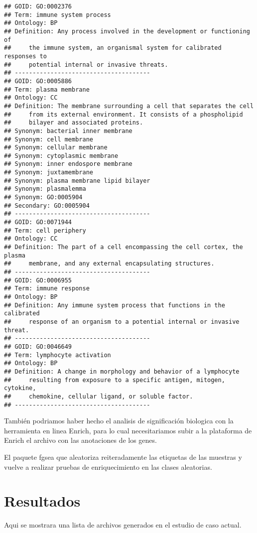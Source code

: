 \documentclass[
]{article}
\begin{document}
\begin{verbatim}
## GOID: GO:0002376
## Term: immune system process
## Ontology: BP
## Definition: Any process involved in the development or functioning of
##     the immune system, an organismal system for calibrated responses to
##     potential internal or invasive threats.
## --------------------------------------
## GOID: GO:0005886
## Term: plasma membrane
## Ontology: CC
## Definition: The membrane surrounding a cell that separates the cell
##     from its external environment. It consists of a phospholipid
##     bilayer and associated proteins.
## Synonym: bacterial inner membrane
## Synonym: cell membrane
## Synonym: cellular membrane
## Synonym: cytoplasmic membrane
## Synonym: inner endospore membrane
## Synonym: juxtamembrane
## Synonym: plasma membrane lipid bilayer
## Synonym: plasmalemma
## Synonym: GO:0005904
## Secondary: GO:0005904
## --------------------------------------
## GOID: GO:0071944
## Term: cell periphery
## Ontology: CC
## Definition: The part of a cell encompassing the cell cortex, the plasma
##     membrane, and any external encapsulating structures.
## --------------------------------------
## GOID: GO:0006955
## Term: immune response
## Ontology: BP
## Definition: Any immune system process that functions in the calibrated
##     response of an organism to a potential internal or invasive threat.
## --------------------------------------
## GOID: GO:0046649
## Term: lymphocyte activation
## Ontology: BP
## Definition: A change in morphology and behavior of a lymphocyte
##     resulting from exposure to a specific antigen, mitogen, cytokine,
##     chemokine, cellular ligand, or soluble factor.
## --------------------------------------
\end{verbatim}

También podriamos haber hecho el analisis de significación biologica con
la herramienta en linea Enrich, para lo cual necesitariamos subir a la
plataforma de Enrich el archivo con las anotaciones de los genes.

El paquete fgsea que aleatoriza reiteradamente las etiquetas de las
muestras y vuelve a realizar pruebas de enriquecimiento en las clases
aleatorias.

\hypertarget{resultados}{%
\section{Resultados}\label{resultados}}

Aqui se mostrara una lista de archivos generados en el estudio de caso
actual.
\end{document}
